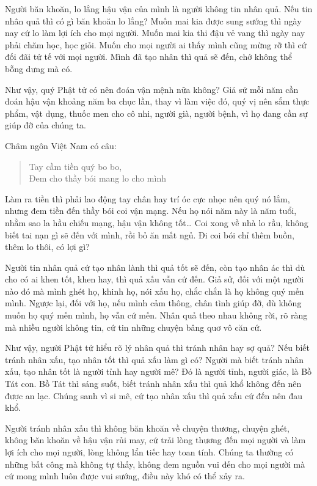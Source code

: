 \documentclass[
  12pt,
  oneside]{book}
\begin{document}
Người băn khoăn, lo lắng hậu vận của mình là người không tin nhân quả. Nếu tin nhân quả thì có gì băn khoăn lo lắng? Muốn mai kia được sung sướng thì ngày nay cứ lo làm lợi ích cho mọi người. Muốn mai kia thi đậu vẻ vang thì ngày nay phải chăm học, học giỏi. Muốn cho mọi người ai thấy mình cũng mừng rỡ thì cứ đối đãi tử tế với mọi người. Mình đã tạo nhân thì quả sẽ đến, chớ không thể bỗng dưng mà có.

Như vậy, quý Phật tử có nên đoán vận mệnh nữa không? Giả sử mỗi năm cần đoán hậu vận khoảng năm ba chục lần, thay vì làm việc đó, quý vị nên sắm thực phẩm, vật dụng, thuốc men cho cô nhi, người già, người bệnh, vì họ đang cần sự giúp đỡ của chúng ta.

Châm ngôn Việt Nam có câu:

\begin{quote}
Tay cầm tiền quý bo bo,\\
Đem cho thầy bói mang lo cho mình
\end{quote}

Làm ra tiền thì phải lao động tay chân hay trí óc cực nhọc nên quý nó lắm, nhưng đem tiền đến thầy bói coi vận mạng. Nếu họ nói năm này là năm tuổi, nhằm sao la hầu chiếu mạng, hậu vận không tốt\ldots{} Coi xong về nhà lo rầu, không biết tai nạn gì sẽ đến với mình, rồi bỏ ăn mất ngủ. Đi coi bói chỉ thêm buồn, thêm lo thôi, có lợi gì?

Người tin nhân quả cứ tạo nhân lành thì quả tốt sẽ đến, còn tạo nhân ác thì dù cho có ai khen tốt, khen hay, thì quả xấu vẫn cứ đến. Giả sử, đối với một người nào đó mà mình ghét họ, khinh họ, nói xấu họ, chắc chắn là họ không quý mến mình. Ngược lại, đối với họ, nếu mình cảm thông, chân tình giúp đỡ, dù không muốn họ quý mến mình, họ vẫn cứ mến. Nhân quả theo nhau không rời, rõ ràng mà nhiều người không tin, cứ tin những chuyện bâng quơ vô căn cứ.

Như vậy, người Phật tử hiểu rõ lý nhân quả thì tránh nhân hay sợ quả? Nếu biết tránh nhân xấu, tạo nhân tốt thì quả xấu làm gì có? Người mà biết tránh nhân xấu, tạo nhân tốt là người tỉnh hay người mê? Đó là người tỉnh, người giác, là Bồ Tát con. Bồ Tát thì sáng suốt, biết tránh nhân xấu thì quả khổ không đến nên được an lạc. Chúng sanh vì si mê, cứ tạo nhân xấu thì quả xấu cứ đến nên đau khổ.

Người tránh nhân xấu thì không băn khoăn về chuyện thương, chuyện ghét, không băn khoăn về hậu vận rủi may, cứ trải lòng thương đến mọi người và làm lợi ích cho mọi người, lòng không lẩn tiếc hay toan tính. Chúng ta thường có những bất công mà không tự thấy, không đem nguồn vui đến cho mọi người mà cứ mong mình luôn được vui sướng, điều này khó có thể xảy ra.
\end{document}

